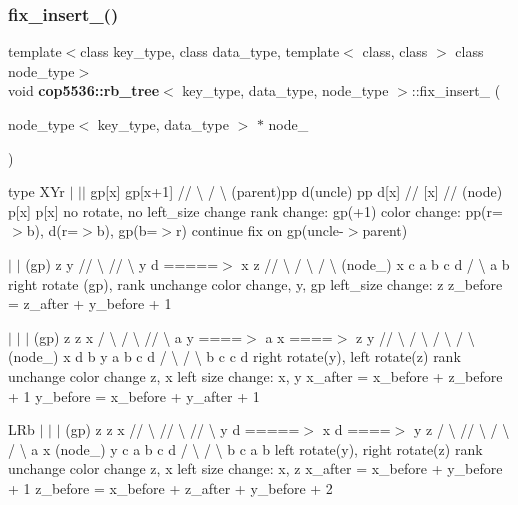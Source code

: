 \mbox{\label{classcop5536_1_1rb__tree_a8c4eb96c329545e4056788be0511cd17}} 
\subsubsection{fix\_insert\_()}
{\footnotesize\ttfamily template$<$class key\+\_\+type, class data\+\_\+type, template$<$ class, class $>$ class node\+\_\+type$>$ \\
void \textbf{ cop5536\+::rb\+\_\+tree}$<$ key\+\_\+type, data\+\_\+type, node\+\_\+type $>$\+::fix\+\_\+insert\+\_\+ (\begin{DoxyParamCaption}\item[{node\+\_\+type$<$ key\+\_\+type, data\+\_\+type $>$ $\ast$}]{node\+\_\+ }\end{DoxyParamCaption})\hspace{0.3cm}{\ttfamily [inline]}}

type X\+Yr $\vert$ $\vert$$\vert$ gp[x] gp[x+1] // \textbackslash{} / \textbackslash{} (parent)pp d(uncle) pp d[x] // [x] // (node) p[x] p[x] no rotate, no left\+\_\+size change rank change\+: gp(+1) color change\+: pp(r=$>$b), d(r=$>$b), gp(b=$>$r) continue fix on gp(uncle-\/$>$parent)

$\vert$ $\vert$ (gp) z y // \textbackslash{} // \textbackslash{} y d =====$>$ x z // \textbackslash{} / \textbackslash{} / \textbackslash{} (node\+\_\+) x c a b c d / \textbackslash{} a b right rotate (gp), rank unchange color change, y, gp left\+\_\+size change\+: z z\+\_\+before = z\+\_\+after + y\+\_\+before + 1

$\vert$ $\vert$ $\vert$ (gp) z z x / \textbackslash{} / \textbackslash{} // \textbackslash{} a y ====$>$ a x ====$>$ z y // \textbackslash{} / \textbackslash{} / \textbackslash{} / \textbackslash{} (node\+\_\+) x d b y a b c d / \textbackslash{} / \textbackslash{} b c c d right rotate(y), left rotate(z) rank unchange color change z, x left size change\+: x, y x\+\_\+after = x\+\_\+before + z\+\_\+before + 1 y\+\_\+before = x\+\_\+before + y\+\_\+after + 1

L\+Rb $\vert$ $\vert$ $\vert$ (gp) z z x // \textbackslash{} // \textbackslash{} // \textbackslash{} y d =====$>$ x d ====$>$ y z / \textbackslash{} // \textbackslash{} / \textbackslash{} / \textbackslash{} a x (node\+\_\+) y c a b c d / \textbackslash{} / \textbackslash{} b c a b left rotate(y), right rotate(z) rank unchange color change z, x left size change\+: x, z x\+\_\+after = x\+\_\+before + y\+\_\+before + 1 z\+\_\+before = x\+\_\+before + z\+\_\+after + y\+\_\+before + 2

